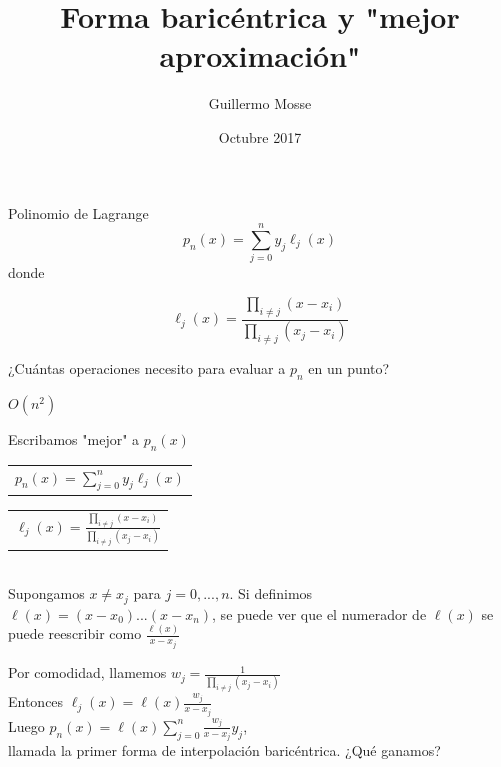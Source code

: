 \documentclass{beamer}
\title{Forma baricéntrica y "mejor aproximación"}
\author{Guillermo Mosse }
\date{Octubre 2017}
\begin{document}
\maketitle





\begin{frame}{Polinomio de Lagrange}
    $$p_n(x) = \sum_{j=0}^{n} y_j \ell_j(x)$$
    donde
    
    $$\ell_j(x) = \frac{\displaystyle\prod_{i\neq j}(x-x_i)}{\displaystyle\prod_{i\neq j}(x_j-x_i)}$$
    
    ¿Cuántas operaciones necesito para evaluar a $p_n$ en un punto? \pause \bigskip
    
    $O(n^2)$
\end{frame}


\begin{frame}{Escribamos "mejor" a $p_n(x)$}
\vfill\noindent
\begin{tabular}[t]{@{}l} 
  $p_n(x) = \sum_{j=0}^{n} y_j \ell_j(x)$
\end{tabular}
\hfill%
\begin{tabular}[t]{l@{}}
   $\ell_j(x) = \frac{\displaystyle\prod_{i\neq j}(x-x_i)}{\displaystyle\prod_{i\neq j}(x_j-x_i)}$
\end{tabular} \bigskip


\hrulefill \\
Supongamos $x \neq x_j$ para $j=0,...,n$. Si definimos $\ell(x) = (x-x_0) ... (x-x_n)$, se puede ver que el numerador de $\ell(x)$ se puede reescribir como $\frac{\ell(x)}{x-x_j}$

Por comodidad, llamemos $w_j = \frac{1}{\displaystyle\prod_{i\neq j}(x_j-x_i)}$ \\

Entonces $\ell_j(x) = \ell(x) \frac{w_j}{x-x_j}$ \\

Luego $p_n(x) = \ell(x) \displaystyle\sum_{j=0}^{n}\frac{w_j}{x-x_j} y_j$,\\

llamada la primer forma de interpolación baricéntrica. ¿Qué ganamos?
\end{frame}
\end{document}
